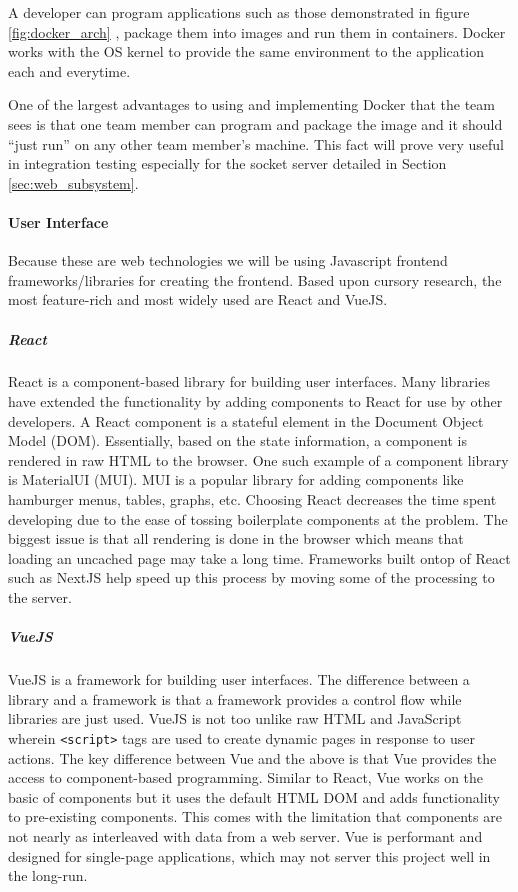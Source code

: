 A developer can program applications such as those demonstrated in figure \ref{fig:docker_arch} \cite{docker-what-container}, package them into images and run them in containers. Docker works with the OS kernel to provide the same environment to the application each and everytime.

One of the largest advantages to using and implementing Docker that the team sees is that one team member can program and package the image and it should ``just run'' on any other team member's machine. This fact will prove very useful in integration testing especially for the socket server detailed in Section \ref{sec:web_subsystem}.

\paragraph{User Interface}
Because these are web technologies we will be using Javascript frontend frameworks/libraries for creating the frontend. Based upon cursory research, the most feature-rich and most widely used are React and VueJS.
\subparagraph{React}
React is a component-based library for building user interfaces.  Many libraries have extended the functionality by adding components to React for use by other developers. A React component is a stateful element in the Document Object Model (DOM). Essentially, based on the state information, a component is rendered in raw HTML to the browser. One such example of a component library is MaterialUI (MUI). MUI is a popular library for adding components like hamburger menus, tables, graphs, etc. Choosing React decreases the time spent developing due to the ease of tossing boilerplate components at the problem. The biggest issue is that all rendering is done in the browser which means that loading an uncached page may take a long time. Frameworks built ontop of React such as NextJS help speed up this process by moving some of the processing to the server.
\subparagraph{VueJS}
VueJS is a framework for building user interfaces. The difference between a library and a framework is that a framework provides a control flow while libraries are just used. VueJS is not too unlike raw HTML and JavaScript wherein \verb|<script>| tags are used to create dynamic pages in response to user actions. The key difference between Vue and the above is that Vue provides the access to component-based programming. Similar to React, Vue works on the basic of components but it uses the default HTML DOM and adds functionality to pre-existing components. This comes with the limitation that components are not nearly as interleaved with data from a web server. Vue is performant and designed for single-page applications, which may not server this project well in the long-run.
